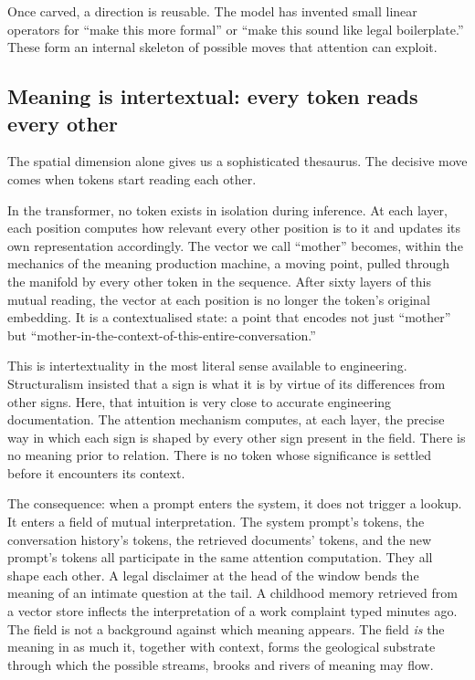 Once carved, a direction is reusable. The model has invented small linear operators for ``make this more formal'' or ``make this sound like legal boilerplate.'' These form an internal skeleton of possible moves that attention can exploit.

\subsection{Meaning is intertextual: every token reads every other}

The spatial dimension alone gives us a sophisticated thesaurus. The decisive move comes when tokens start reading each other.

In the transformer, no token exists in isolation during inference. At each layer, each position computes how relevant every other position is to it and updates its own representation accordingly. The vector we call ``mother'' becomes, within the mechanics of the meaning production machine, a moving point, pulled through the manifold by every other token in the sequence. After sixty layers of this mutual reading, the vector at each position is no longer the token's original embedding. It is a contextualised state: a point that encodes not just ``mother'' but ``mother-in-the-context-of-this-entire-conversation.''

This is intertextuality in the most literal sense available to engineering. Structuralism insisted that a sign is what it is by virtue of its differences from other signs. Here, that intuition is very close to accurate engineering documentation. The attention mechanism computes, at each layer, the precise way in which each sign is shaped by every other sign present in the field. There is no meaning prior to relation. There is no token whose significance is settled before it encounters its context.

The consequence: when a prompt enters the system, it does not trigger a lookup. It enters a field of mutual interpretation. The system prompt's tokens, the conversation history's tokens, the retrieved documents' tokens, and the new prompt's tokens all participate in the same attention computation. They all shape each other. A legal disclaimer at the head of the window bends the meaning of an intimate question at the tail. A childhood memory retrieved from a vector store inflects the interpretation of a work complaint typed minutes ago. The field is not a background against which meaning appears. The field \emph{is} the meaning in as much it, together with context, forms the geological substrate through which the possible streams, brooks and rivers of meaning may flow.

